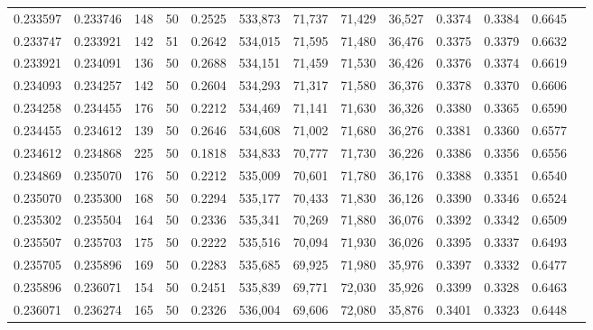 \begin{tabular}{rrrrrrrrrrrrr}
0.233597 & 0.233746 &   148 &  50 &                                     0.2525 & 533,873 &  71,737 &  71,429 &  36,527 & 0.3374 & 0.3384 & 0.6645 \\
0.233747 & 0.233921 &   142 &  51 &                                     0.2642 & 534,015 &  71,595 &  71,480 &  36,476 & 0.3375 & 0.3379 & 0.6632 \\
0.233921 & 0.234091 &   136 &  50 &                                     0.2688 & 534,151 &  71,459 &  71,530 &  36,426 & 0.3376 & 0.3374 & 0.6619 \\
0.234093 & 0.234257 &   142 &  50 &                                     0.2604 & 534,293 &  71,317 &  71,580 &  36,376 & 0.3378 & 0.3370 & 0.6606 \\
0.234258 & 0.234455 &   176 &  50 &                                     0.2212 & 534,469 &  71,141 &  71,630 &  36,326 & 0.3380 & 0.3365 & 0.6590 \\
0.234455 & 0.234612 &   139 &  50 &                                     0.2646 & 534,608 &  71,002 &  71,680 &  36,276 & 0.3381 & 0.3360 & 0.6577 \\
0.234612 & 0.234868 &   225 &  50 &                                     0.1818 & 534,833 &  70,777 &  71,730 &  36,226 & 0.3386 & 0.3356 & 0.6556 \\
0.234869 & 0.235070 &   176 &  50 &                                     0.2212 & 535,009 &  70,601 &  71,780 &  36,176 & 0.3388 & 0.3351 & 0.6540 \\
0.235070 & 0.235300 &   168 &  50 &                                     0.2294 & 535,177 &  70,433 &  71,830 &  36,126 & 0.3390 & 0.3346 & 0.6524 \\
0.235302 & 0.235504 &   164 &  50 &                                     0.2336 & 535,341 &  70,269 &  71,880 &  36,076 & 0.3392 & 0.3342 & 0.6509 \\
0.235507 & 0.235703 &   175 &  50 &                                     0.2222 & 535,516 &  70,094 &  71,930 &  36,026 & 0.3395 & 0.3337 & 0.6493 \\
0.235705 & 0.235896 &   169 &  50 &                                     0.2283 & 535,685 &  69,925 &  71,980 &  35,976 & 0.3397 & 0.3332 & 0.6477 \\
0.235896 & 0.236071 &   154 &  50 &                                     0.2451 & 535,839 &  69,771 &  72,030 &  35,926 & 0.3399 & 0.3328 & 0.6463 \\
0.236071 & 0.236274 &   165 &  50 &                                     0.2326 & 536,004 &  69,606 &  72,080 &  35,876 & 0.3401 & 0.3323 & 0.6448 \\

\end{tabular}
